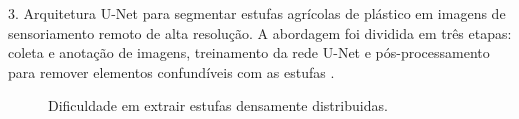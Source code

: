 \documentclass[%
  10pt,%
  aspectratio = 169,%
  compress,%
  t,%
  english,%
  brazilian,%
  tikz,
]{beamer}
\begin{document}
\begin{frame}
    3. Arquitetura U-Net para segmentar estufas agrícolas de plástico em imagens de sensoriamento remoto de alta resolução. A abordagem foi dividida em três etapas: coleta e anotação de imagens, treinamento da rede U-Net e pós-processamento para remover elementos confundíveis com as estufas \textbf{\cite{Chen2021}}.
    \begin{figure}[!htb]
        \centering%
        \caption{Dificuldade em extrair estufas densamente distribuidas.}%
        \label{fig:alam2021}
    \end{figure}
    
\end{frame}



\end{document}
